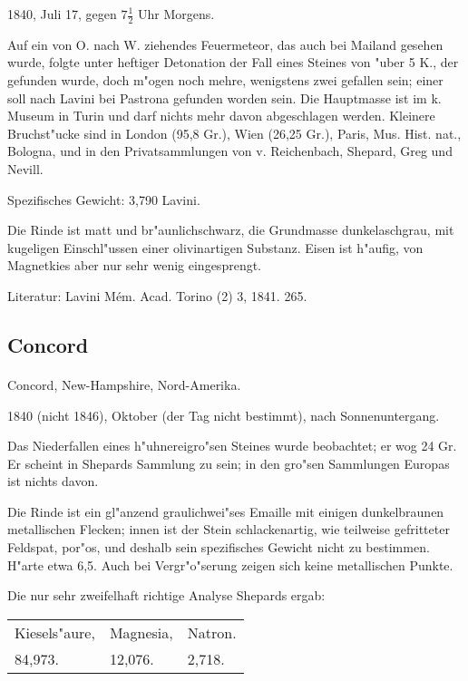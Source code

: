 \documentclass[a4paper, 11pt, oneside]{article}
\begin{document}
1840, Juli 17, gegen $7\frac{1}{2}$ Uhr Morgens.

Auf ein von O. nach W. ziehendes Feuermeteor, das auch bei Mailand gesehen wurde, folgte unter heftiger Detonation der Fall eines Steines von "uber 5 K., der gefunden wurde, doch m"ogen noch mehre, wenigstens zwei gefallen sein; einer soll nach Lavini bei Pastrona gefunden worden sein. Die Hauptmasse ist im k. Museum in Turin und darf nichts mehr davon abgeschlagen werden. Kleinere Bruchst"ucke sind in London (95,8 Gr.), Wien (26,25 Gr.), Paris, Mus. Hist. nat., Bologna, und in den Privatsammlungen von v. Reichenbach, Shepard, Greg und Nevill.

Spezifisches Gewicht: 3,790 Lavini.

Die Rinde ist matt und br"aunlichschwarz, die Grundmasse dunkelaschgrau, mit kugeligen Einschl"ussen einer olivinartigen Substanz. Eisen ist h"aufig, von Magnetkies aber nur sehr wenig eingesprengt.

\footnotesize
Literatur: Lavini Mém. Acad. Torino (2) 3, 1841. 265.

\subsection{Concord}
\normalsize
\paragraph{}
Concord, New-Hampshire, Nord-Amerika.

1840 (nicht 1846), Oktober (der Tag nicht bestimmt), nach Sonnenuntergang.

Das Niederfallen eines h"uhnereigro"sen Steines wurde beobachtet; er wog 24 Gr. Er scheint in Shepards Sammlung zu sein; in den gro"sen Sammlungen Europas ist nichts davon.

Die Rinde ist ein gl"anzend graulichwei"ses Emaille mit einigen dunkelbraunen metallischen Flecken; innen ist der Stein schlackenartig, wie teilweise gefritteter Feldspat, por"os, und deshalb sein spezifisches Gewicht nicht zu bestimmen. H"arte etwa 6,5. Auch bei Vergr"o"serung zeigen sich keine metallischen Punkte.

Die nur sehr zweifelhaft richtige Analyse Shepards ergab:
\begin{table}[!ht]
    \centering
    \begin{tabular}{l l l}
        Kiesels"aure, & Magnesia, & Natron. \\
        84,973. & 12,076. & 2,718. \\
    \end{tabular}
\end{table}
\end{document}
